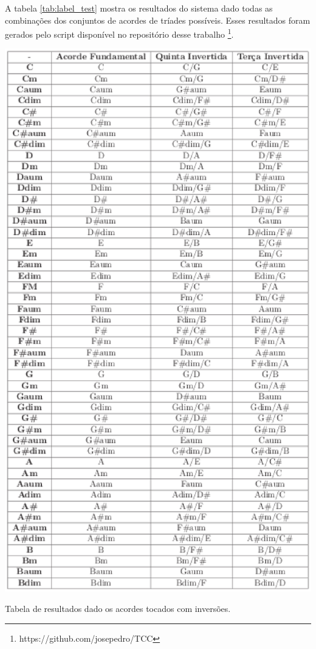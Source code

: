 A tabela \ref{tab:label_test} mostra os resultados do sistema dado todas as combinações dos conjuntos de acordes de tríades possíveis. Esses resultados foram gerados pelo script disponível no repositório desse trabalho \footnote{https://github.com/josepedro/TCC}.

\begin{table}[h]
  \label{tab:label_test}
  \centering
  \includegraphics[keepaspectratio=true,scale=0.8]{figuras/tabela_acordes_completos.eps}
  \caption{Tabela de resultados dado os acordes tocados com inversões.}
\end{table}

